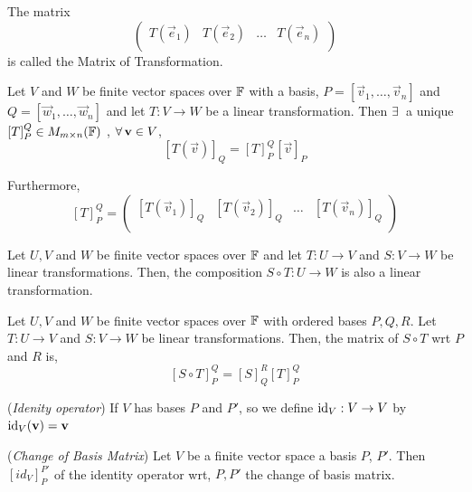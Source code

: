 \documentclass{article}
\begin{document}
The matrix
$$ \begin{pmatrix}
  T(\vec e_1) & T(\vec e_2) & \dots & T(\vec e_n)\\
\end{pmatrix} $$
is called the Matrix of Transformation.

\begin{nthm}
  Let $V$ and $W$ be finite vector spaces over $\mathbb{F}$ with a basis, $P = [\vec v_1, \dots, \vec v_n]$ and $Q = [\vec w_1,\dots, \vec w_n]$ and let $T : V \to W$ be a linear transformation. Then $\exists\,$ a unique $[T]_P^Q \in M_{m\times n}(\mathbb{F})$ , $\forall\, \boldsymbol{\mathbf{v}} \in V$,
  $$ [T(\vec v)]_Q = [T]_P^Q [\vec v]_P $$
\end{nthm}

Furthermore,
$$ [T]_P^Q = \begin{pmatrix}
  [T(\vec v_1)]_Q & [T(\vec v_2)]_Q & \dots & [T(\vec v_n)]_Q \\
\end{pmatrix} $$

\begin{center}
\end{center}
\begin{nlemma}
  Let $U, V$ and $W$ be finite vector spaces over $\mathbb{F}$ and let $T: U \to V$ and $S : V\to W$ be linear transformations. Then, the composition $S \circ T : U \to W$ is also a linear transformation.
\end{nlemma}

\begin{nthm}
  Let $U, V$ and $W$ be finite vector spaces over $\mathbb{F}$ with ordered bases $P, Q, R$. Let $T : U \to V$ and $S : V \to W$ be linear transformations. Then, the matrix of $S \circ T$ wrt $P$ and $R$ is,
  $$ [S \circ T]_P^Q = [S]_Q^R[T]_P^Q $$
\end{nthm}

\begin{ndefi}{(\textit{Idenity operator})}
  If $V$ has bases $P$ and $P'$, so we define $\operatorname{id}_V : V \to V$ by $\operatorname{id}_V (\boldsymbol{\mathbf{v}}) = \boldsymbol{\mathbf{v}}$
\end{ndefi}

\begin{ndefi}{(\textit{Change of Basis Matrix})}
  Let $V$ be a finite vector space a basis $P$, $P'$. Then $[id_V]_P^{P'}$ of the identity operator wrt, $P, P'$ the change of basis matrix.
\end{ndefi}
\end{document}
